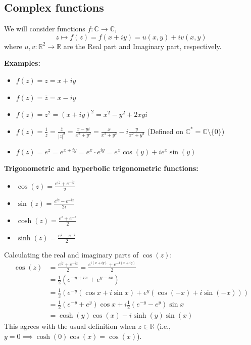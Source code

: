 \subsection{Complex functions}

We will consider functions $f: \mathbb{C} \rightarrow \mathbb{C}$,
$$ z \mapsto f(z) = f(x + iy) = u(x,y) + iv(x,y) $$
where $u, v: \mathbb{R}^{2} \rightarrow \mathbb{R}$ are the Real part and Imaginary part, respectively.

\textbf{Examples:}
\begin{itemize}
    \item $f(z) = z = x + iy$
    \item $f(z) = \overline{z} = x - iy$
    \item $f(z) = z^{2} = (x+iy)^{2} = x^{2} - y^{2} + 2xyi$
    \item $f(z) = \frac{1}{z} = \frac{\overline{z}}{|z|^{2}} = \frac{x - yi}{x^{2} + y^{2}} = \frac{x}{x^{2} + y^{2}} - i\frac{y}{x^{2} + y^{2}}$ \quad (Defined on $\mathbb{C}^{*} = \mathbb{C} \setminus \{0\}$)
    \item $f(z) = e^{z} = e^{x+iy} = e^{x} \cdot e^{iy} = e^{x}\cos(y) + ie^{x}\sin(y)$
\end{itemize}

\textbf{Trigonometric and hyperbolic trigonometric functions:}
\begin{itemize}
    \item $\cos(z) = \frac{e^{iz} + e^{-iz}}{2}$
    \item $\sin(z) = \frac{e^{iz} - e^{-iz}}{2i}$
    \item $\cosh(z) = \frac{e^{z} + e^{-z}}{2}$
    \item $\sinh(z) = \frac{e^{z} - e^{-z}}{2}$
\end{itemize}

Calculating the real and imaginary parts of $\cos(z)$:
\begin{align*}
\cos(z) &= \frac{e^{iz} + e^{-iz}}{2} = \frac{e^{i(x+iy)} + e^{-i(x+iy)}}{2} \\
&= \frac{1}{2}\left(e^{-y+ix} + e^{y-ix}\right) \\
&= \frac{1}{2}\left(e^{-y}(\cos x + i\sin x) + e^{y}(\cos(-x) + i\sin(-x))\right) \\
&= \frac{1}{2}\left(e^{-y} + e^{y}\right)\cos x + i\frac{1}{2}\left(e^{-y} - e^{y}\right)\sin x \\
&= \cosh(y)\cos(x) - i\sinh(y)\sin(x)
\end{align*}
This agrees with the usual definition when $z \in \mathbb{R}$ (i.e., $y = 0 \implies \cosh(0)\cos(x) = \cos(x)$).

